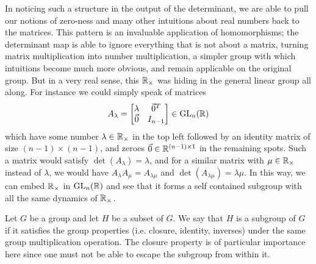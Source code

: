 \documentclass[11pt]{article}
\begin{document}
In noticing such a structure in the output of the determinant, we are able to pull our notions of zero-ness and many other intuitions about real numbers back to the matrices. This pattern is an invaluable application of homomorphisms; the determinant map is able to ignore everything that is not  about a matrix, turning matrix multiplication into number multiplication, a simpler group with which intuitions become much more obvious, and remain applicable on the original group. But in a very real sense, this $\mathbb{R}_\times$ was hiding in the general linear group all along. For instance we could simply speak of matrices \begin{gather*}
A_\lambda = \begin{bmatrix}
\lambda & \vec{0}^T \\
\vec{0} & I_{n-1}
\end{bmatrix} \in
\mathrm{GL}_n(\mathbb{R})
\end{gather*}
which have some number $\lambda \in \mathbb{R}_\times$ in the top left followed by an identity matrix of size $(n-1) \times (n-1)$, and zeroes $\vec{0} \in \mathbb{R}^{(n-1) \times 1}$ in the remaining spots. Such a matrix would satisfy $\det(A_\lambda) = \lambda$, and for a similar matrix with $\mu \in \mathbb{R}_\times$ instead of $\lambda$, we would have $A_\lambda A_\mu = A_{\lambda \mu}$ and $\det(A_{\lambda \mu}) = \lambda \mu$. In this way, we can embed $\mathbb{R}_\times$ in $\mathrm{GL}_n(\mathbb{R})$ and see that it forms a self contained subgroup with all the same dynamics of $\mathbb{R}_\times$.

\begin{definition}[Subgroup]
Let $G$ be a group and let $H$ be a subset of $G$. We say that $H$ is a subgroup of $G$ if it satisfies the group properties (i.e. closure, identity, inverses) under the same group multiplication operation. The closure property is of particular importance here since one must not be able to escape the subgroup from within it.
\end{definition}
\end{document}
